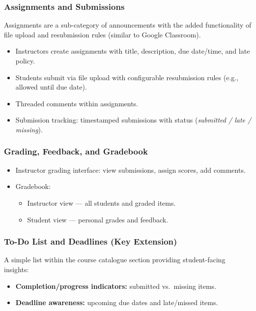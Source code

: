 \documentclass[12pt, a4paper]{article}
\begin{document}
\subsubsection{Assignments and Submissions}
Assignments are a sub-category of announcements with the added functionality
of file upload and resubmission rules (similar to Google Classroom).
\begin{itemize}
  \item Instructors create assignments with title, description, due date/time,
        and late policy.
  \item Students submit via file upload with configurable resubmission rules
        (e.g., allowed until due date).
  \item Threaded comments within assignments.
  \item Submission tracking: timestamped submissions with status
        (\emph{submitted / late / missing}).
\end{itemize}

\subsubsection{Grading, Feedback, and Gradebook}
\begin{itemize}
  \item Instructor grading interface: view submissions, assign scores, add
        comments.
  \item Gradebook:
    \begin{itemize}
      \item Instructor view — all students and graded items.
      \item Student view — personal grades and feedback.
    \end{itemize}
\end{itemize}

\subsubsection{To-Do List and Deadlines \texorpdfstring{\normalfont\small(Key Extension)}{}}
A simple list within the course catalogue section providing student-facing
insights:
\begin{itemize}
  \item \textbf{Completion/progress indicators:} submitted vs.\ missing items.
  \item \textbf{Deadline awareness:} upcoming due dates and late/missed items.
\end{itemize}
\end{document}
